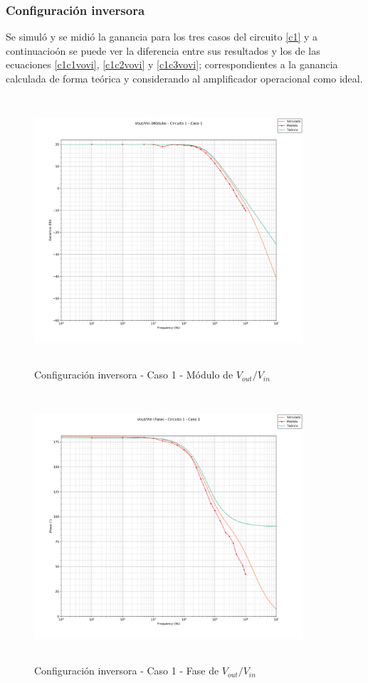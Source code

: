 \subsubsection*{Configuraci\'on inversora}
Se simul\'o y se midi\'o la ganancia para los tres casos del circuito \ref{c1} 
y a continuacio\'on se puede ver la diferencia entre sus resultados y los 
de las ecuaciones \ref{c1c1vovi}, \ref{c1c2vovi} y \ref{c1c3vovi}; correspondientes a 
la ganancia calculada de forma te\'orica y considerando al amplificador operacional como ideal.


\begin{figure}[H] %
	\centering
	\includegraphics[width=10cm,height=10cm,keepaspectratio]{../EJ1/00GRAFICOS/c1c1/c1c1voviMod.png}
	\caption{Configuración inversora -  Caso 1 - Módulo de $V_{out}/V_{in}$}
	\label{c1c1voviM}
\end{figure}

\begin{figure}[H] %
	\centering
	\includegraphics[width=10cm,height=10cm,keepaspectratio]{../EJ1/00GRAFICOS/c1c1/c1c1voviFASE.png}
	\caption{Configuración inversora - Caso 1 - Fase de $V_{out}/V_{in}$}
	\label{c1c1voviP}
\end{figure}

